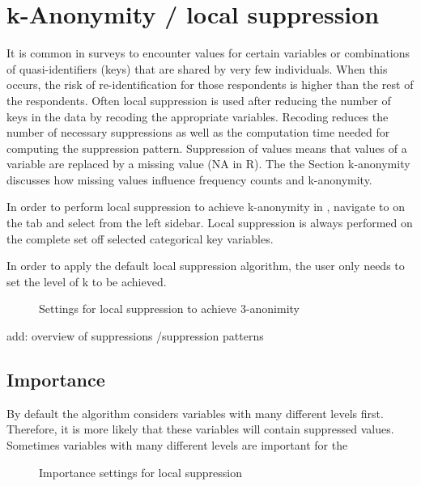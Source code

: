 \documentclass[letterpaper,10pt,english]{sphinxmanual}
\begin{document}
\section{k-Anonymity / local suppression}
\label{\detokenize{anon:k-anonymity-local-suppression}}
It is common in surveys to encounter values for certain variables or combinations
of quasi-identifiers (keys) that are shared by very few individuals. When this occurs,
the risk of re-identification for those respondents is higher than the rest of the
respondents. Often local suppression is used after
reducing the number of keys in the data by recoding the appropriate variables.
Recoding reduces the number of necessary suppressions as well as the computation
time needed for computing the suppression pattern. Suppression of values means that values of a variable
are replaced by a missing value (NA in R). The the Section k-anonymity discusses how
missing values influence frequency counts and k-anonymity.

In order to perform local suppression to achieve k-anonymity in ,
navigate to on the  tab and select  from the left sidebar.
Local suppression is always performed on the complete set off selected categorical
key variables.

In order to apply the default local suppression algorithm, the user only needs to set the
level of k to be achieved.

\begin{figure}[htbp]
\centering
\capstart

\noindent{}
\caption{Settings for local suppression to achieve 3-anonimity}\label{\detokenize{anon:fig83}}\label{\detokenize{anon:id3}}\end{figure}

add: overview of suppressions /suppression patterns


\subsection{Importance}
\label{\detokenize{anon:importance}}
By default the algorithm considers variables with many different levels first. Therefore,
it is more likely that these variables will contain suppressed values. Sometimes variables
with many different levels are important for the

\begin{figure}[htbp]
\centering
\capstart

\noindent{}
\caption{Importance settings for local suppression}\label{\detokenize{anon:fig84}}\label{\detokenize{anon:id4}}\end{figure}
\end{document}
